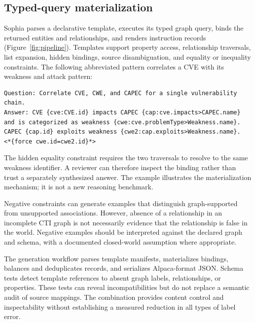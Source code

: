 \documentclass[twocolumn]{svjour3}
\begin{document}
\subsection{Typed-query materialization}
Sophia parses a declarative template, executes its typed graph query, binds the returned entities and relationships, and renders instruction records (Figure~\ref{fig:pipeline}). Templates support property access, relationship traversals, list expansion, hidden bindings, source disambiguation, and equality or inequality constraints. The following abbreviated pattern correlates a CVE with its weakness and attack pattern:
\begin{lstlisting}
Question: Correlate CVE, CWE, and CAPEC for a single vulnerability chain.
Answer: CVE {cve:CVE.id} impacts CAPEC {cap:cve.impacts>CAPEC.name}
and is categorized as weakness {cwe:cve.problemType>Weakness.name}.
CAPEC {cap.id} exploits weakness {cwe2:cap.exploits>Weakness.name}.
<*{force cwe.id=cwe2.id}*>
\end{lstlisting}
The hidden equality constraint requires the two traversals to resolve to the same weakness identifier. A reviewer can therefore inspect the binding rather than trust a separately synthesized answer. The example illustrates the materialization mechanism; it is not a new reasoning benchmark.

Negative constraints can generate examples that distinguish graph-supported from unsupported associations. However, absence of a relationship in an incomplete CTI graph is not necessarily evidence that the relationship is false in the world. Negative examples should be interpreted against the declared graph and schema, with a documented closed-world assumption where appropriate.

The generation workflow parses template manifests, materializes bindings, balances and deduplicates records, and serializes Alpaca-format JSON. Schema tests detect template references to absent graph labels, relationships, or properties. These tests can reveal incompatibilities but do not replace a semantic audit of source mappings. The combination provides content control and inspectability without establishing a measured reduction in all types of label error.
\end{document}
